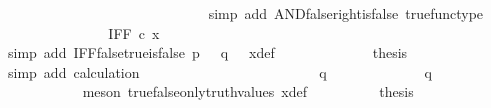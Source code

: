 \begin{isabellebody}
\ \ \ \ \ \ \ \ \ \ \isamarkupfalse%
\ \isamarkupfalse%
\ {\isachardoublequoteopen}{\isachardot}{\kern0pt}{\isachardot}{\kern0pt}{\isachardot}{\kern0pt}\ {\isacharequal}{\kern0pt}\ {\isasymf}{\isachardoublequoteclose}\isanewline
\ \ \ \ \ \ \ \ \ \ \ \ \isamarkupfalse%
\ {\isacharparenleft}{\kern0pt}simp\ add{\isacharcolon}{\kern0pt}\ AND{\isacharunderscore}{\kern0pt}false{\isacharunderscore}{\kern0pt}right{\isacharunderscore}{\kern0pt}is{\isacharunderscore}{\kern0pt}false\ true{\isacharunderscore}{\kern0pt}func{\isacharunderscore}{\kern0pt}type{\isacharparenright}{\kern0pt}\isanewline
\ \ \ \ \ \ \ \ \ \ \isamarkupfalse%
\ \isamarkupfalse%
\ {\isachardoublequoteopen}{\isachardot}{\kern0pt}{\isachardot}{\kern0pt}{\isachardot}{\kern0pt}\ {\isacharequal}{\kern0pt}\ IFF\ {\isasymcirc}\isactrlsub c\ x{\isachardoublequoteclose}\isanewline
\ \ \ \ \ \ \ \ \ \ \ \ \isamarkupfalse%
\ {\isacharparenleft}{\kern0pt}simp\ add{\isacharcolon}{\kern0pt}\ IFF{\isacharunderscore}{\kern0pt}false{\isacharunderscore}{\kern0pt}true{\isacharunderscore}{\kern0pt}is{\isacharunderscore}{\kern0pt}false\ {\isacartoucheopen}p\ {\isacharequal}{\kern0pt}\ {\isasymf}{\isacartoucheclose}\ {\isacartoucheopen}q\ {\isacharequal}{\kern0pt}\ {\isasymt}{\isacartoucheclose}\ x{\isacharunderscore}{\kern0pt}def{\isacharparenright}{\kern0pt}\isanewline
\ \ \ \ \ \ \ \ \ \ \isamarkupfalse%
\ \isamarkupfalse%
\ {\isacharquery}{\kern0pt}thesis\isanewline
\ \ \ \ \ \ \ \ \ \ \ \ \isamarkupfalse%
\ {\isacharparenleft}{\kern0pt}simp\ add{\isacharcolon}{\kern0pt}\ calculation{\isacharparenright}{\kern0pt}\isanewline
\ \ \ \ \ \ \ \ \isamarkupfalse%
\isanewline
\ \ \ \ \ \ \isamarkupfalse%
\isanewline
\ \ \ \ \ \ \ \ \isamarkupfalse%
\ {\isachardoublequoteopen}q\ {\isasymnoteq}\ {\isasymt}{\isachardoublequoteclose}\isanewline
\ \ \ \ \ \ \ \ \isamarkupfalse%
\ \isamarkupfalse%
\ {\isachardoublequoteopen}q\ {\isacharequal}{\kern0pt}\ {\isasymf}{\isachardoublequoteclose}\isanewline
\ \ \ \ \ \ \ \ \ \ \isamarkupfalse%
\ {\isacharparenleft}{\kern0pt}meson\ true{\isacharunderscore}{\kern0pt}false{\isacharunderscore}{\kern0pt}only{\isacharunderscore}{\kern0pt}truth{\isacharunderscore}{\kern0pt}values\ x{\isacharunderscore}{\kern0pt}def{\isacharparenright}{\kern0pt}\isanewline
\ \ \ \ \ \ \ \ \isamarkupfalse%
\ {\isacharquery}{\kern0pt}thesis\isanewline

\end{isabellebody}
